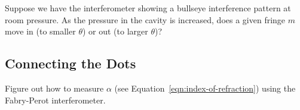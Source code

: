 \documentclass[]{manual}
\begin{document}
    Suppose we have the interferometer showing a bullseye interference pattern at room pressure.
    As the pressure in the cavity is increased, does a given fringe $m$ move in (to smaller $\theta$) or out (to larger $\theta$)?


    \subsection{Connecting the Dots}

    Figure out how to measure $\alpha$ (see Equation~\eqref{eqn:index-of-refraction}) using the Fabry-Perot interferometer.

\end{document}

